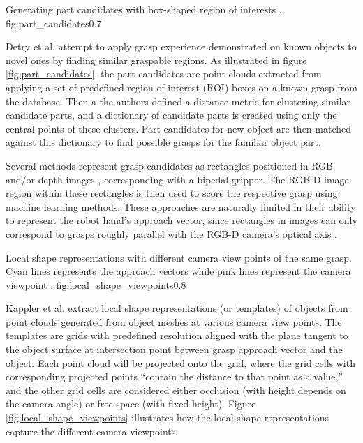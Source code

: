 {Generating part candidates with box-shaped region of interests \cite{Detry2012}.}
{fig:part_candidates}{0.7\textwidth}

Detry et al. \cite{Detry2012} attempt to apply grasp experience demonstrated on known objects to novel ones by finding
similar graspable regions. As illustrated in figure \ref{fig:part_candidates}, the part candidates are point clouds
extracted from applying a set of predefined region of interest (ROI) boxes on a known grasp from the database. Then a
the authors defined a distance metric for clustering similar candidate parts, and a dictionary of candidate parts is
created using only the central points of these clusters. Part candidates for new object are then matched against this
dictionary to find possible grasps for the familiar object part.

Several methods represent grasp candidates as rectangles positioned in RGB and/or depth images \cite{lenz2015,jiang2011},
corresponding with a bipedal gripper. The RGB-D image region within these rectangles is then used to score the
respective grasp using machine learning methods. These approaches are naturally limited in their ability to represent
the robot hand's approach vector, since rectangles in images can only correspond to grasps roughly parallel with
the RGB-D camera's optical axis \cite{Gualtieri2016}.

             {Local shape representations with different camera view points of the same grasp. Cyan lines represents the
              approach vectors while pink lines represent the camera viewpoint \cite{Kappler2015}.}
             {fig:local_shape_viewpoints}{0.8\textwidth}

Kappler et al. \cite{Kappler2015} extract local shape representations (or templates) of objects from point clouds
generated from object meshes at various camera view points. The templates are grids with predefined resolution
aligned with the plane tangent to the object surface at intersection point between grasp approach vector and the
object. Each point cloud will be projected onto the grid, where the grid cells with corresponding projected points
``contain the distance to that point as a value,'' and the other grid cells are considered either occlusion
(with height depends on the camera angle) or free space (with fixed height). Figure \ref{fig:local_shape_viewpoints}
illustrates how the local shape representations capture the different camera viewpoints.

